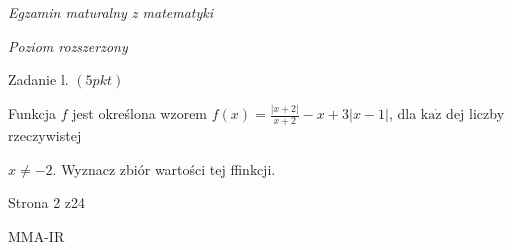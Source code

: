 \documentclass[a4paper,12pt]{article}
\begin{document}
{\it Egzamin maturalny z matematyki}

{\it Poziom rozszerzony}

Zadanie l. $(5pkt)$

Funkcja $f$ jest określona wzorem $f(x)=\displaystyle \frac{|x+2|}{x+2}-x+3|x-1|$, dla $\mathrm{k}\mathrm{a}\dot{\mathrm{z}}$ dej liczby rzeczywistej

$x\neq-2$. Wyznacz zbiór wartości tej ffinkcji.

Strona 2 z24

MMA-IR
\end{document}
